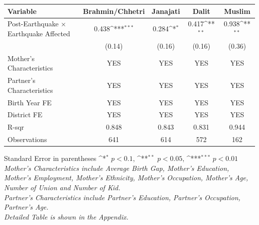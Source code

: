 \def\sym#1{\ifmmode^{#1}\else\(^{#1}\)\fi}
\renewcommand{\arraystretch}{1.4}
\small
\setlength{\tabcolsep}{6pt}

\begin{flushleft}
\begin{tabular}{@{}p{7.5cm}*{4}{c}@{}}
\hline\hline
Variable & Brahmin/Chhetri & Janajati & Dalit & Muslim \\
\hline
Post-Earthquake × Earthquake Affected & 0.438\sym{***} & 0.284\sym{*} & 0.417\sym{**} & 0.938\sym{**} \\
                                      & (0.14) & (0.16) & (0.16) & (0.36) \\
\hline
Mother's Characteristics              & YES & YES & YES & YES \\
Partner's Characteristics             & YES & YES & YES & YES \\
\hline
Birth Year FE                         & YES & YES & YES & YES \\
District FE                           & YES & YES & YES & YES \\
R-sqr                                 & 0.848 & 0.843 & 0.831 & 0.944 \\
Observations                          & 641 & 614 & 572 & 162 \\
\hline\hline
\end{tabular}

\vspace{4pt}
\noindent\footnotesize
Standard Error in parentheses \sym{*} \(p<0.1\), \sym{**} \(p<0.05\), \sym{***} \(p<0.01\)\\
\textit{Mother’s Characteristics include Average Birth Gap, Mother’s Education, Mother’s Employment, Mother’s Ethnicity, Mother’s Occupation, Mother’s Age, Number of Union and Number of Kid.}\\
\textit{Partner’s Characteristics include Partner’s Education, Partner’s Occupation, Partner’s Age.}\\
\textit{Detailed Table is shown in the Appendix.}
\end{flushleft}
